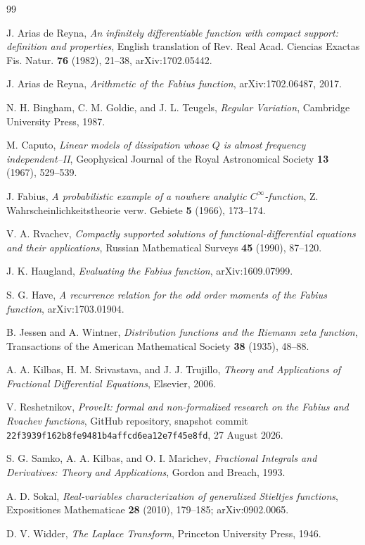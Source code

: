 \documentclass[11pt,oneside]{article}
\theoremstyle{definition}
\theoremstyle{remark}
\newcommand{\1}{\mathbf 1}
\begin{document}
\begin{thebibliography}{99}

J. Arias de Reyna,
\emph{An infinitely differentiable function with compact support: definition
and properties}, English translation of Rev. Real Acad. Ciencias Exactas
Fis. Natur. \textbf{76} (1982), 21--38, arXiv:1702.05442.

J. Arias de Reyna,
\emph{Arithmetic of the Fabius function},
arXiv:1702.06487, 2017.

N. H. Bingham, C. M. Goldie, and J. L. Teugels,
\emph{Regular Variation}, Cambridge University Press, 1987.

M. Caputo,
\emph{Linear models of dissipation whose $Q$ is almost frequency
independent--II}, Geophysical Journal of the Royal Astronomical Society
\textbf{13} (1967), 529--539.

J. Fabius,
\emph{A probabilistic example of a nowhere analytic $C^\infty$-function},
Z. Wahrscheinlichkeitstheorie verw. Gebiete \textbf{5} (1966), 173--174.

V. A. Rvachev,
\emph{Compactly supported solutions of functional-differential equations
and their applications}, Russian Mathematical Surveys \textbf{45} (1990),
87--120.

J. K. Haugland,
\emph{Evaluating the Fabius function}, arXiv:1609.07999.

S. G. Have,
\emph{A recurrence relation for the odd order moments of the Fabius
function}, arXiv:1703.01904.

B. Jessen and A. Wintner,
\emph{Distribution functions and the Riemann zeta function},
Transactions of the American Mathematical Society \textbf{38} (1935),
48--88.

A. A. Kilbas, H. M. Srivastava, and J. J. Trujillo,
\emph{Theory and Applications of Fractional Differential Equations},
Elsevier, 2006.

V. Reshetnikov,
\emph{ProveIt: formal and non-formalized research on the Fabius and Rvachev
functions}, GitHub repository, snapshot commit
\texttt{22f3939f162b8fe9481b4affcd6ea12e7f45e8fd}, 27 August 2026.

S. G. Samko, A. A. Kilbas, and O. I. Marichev,
\emph{Fractional Integrals and Derivatives: Theory and Applications},
Gordon and Breach, 1993.

A. D. Sokal,
\emph{Real-variables characterization of generalized Stieltjes functions},
Expositiones Mathematicae \textbf{28} (2010), 179--185;
arXiv:0902.0065.

D. V. Widder,
\emph{The Laplace Transform}, Princeton University Press, 1946.

\end{thebibliography}
\end{document}
